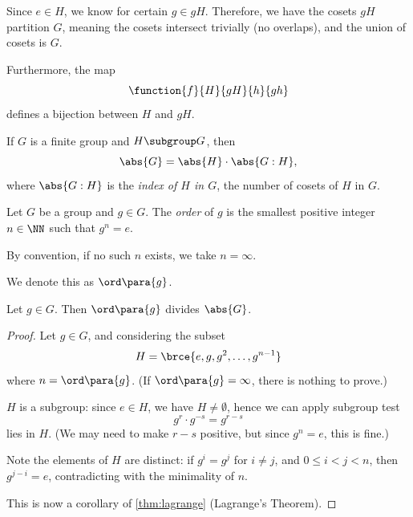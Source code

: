 Since \(e \in H\), we know for certain \(g \in gH\). Therefore, we have the cosets \(gH\) partition \(G\), meaning the cosets intersect trivially (no overlaps), and the union of cosets is \(G\).

Furthermore, the map
\[
    \function{f}{H}{gH}{h}{gh}
\]
defines a bijection between \(H\) and \(gH\).

\begin{theorem}[Lagrange]
    \label{thm:lagrange}%
    If \(G\) is a finite group and \(H \subgroup G\), then
    \[
        \abs{G} = \abs{H} \cdot \abs{G : H},
    \]
    where \(\abs{G : H}\) is the \emph{index of \(H\) in \(G\)}, the number of cosets of \(H\) in \(G\).
\end{theorem}

\begin{definition}
    \label{def:order-of-element}%
    Let \(G\) be a group and \(g \in G\). The \emph{order} of \(g\) is the smallest positive integer \(n \in \NN\) such that \(g^n = e\).

    By convention, if no such \(n\) exists, we take \(n = \infty\).

    We denote this as \(\ord\para{g}\).
\end{definition}

\begin{proposition}
    \label{prop:order-of-element-divides-order-of-group}%
    Let \(g \in G\). Then \(\ord\para{g}\) divides \(\abs{G}\).
\end{proposition}

\begin{proof}
    Let \(g \in G\), and considering the subset
    \[
        H = \brce{e, g, g^2, \ldots, g^{n - 1}}
    \]
    where \(n = \ord\para{g}\). (If \(\ord\para{g} = \infty\), there is nothing to prove.)

    \(H\) is a subgroup: since \(e \in H\), we have \(H \neq \emptyset\), hence we can apply subgroup test
    \[
        g^r \cdot g^{-s} = g^{r - s}
    \]
    lies in \(H\). (We may need to make \(r - s\) positive, but since \(g^n = e\), this is fine.)

    Note the elements of \(H\) are distinct: if \(g^{i} = g^{j}\) for \(i \neq j\), and \(0 \leq i < j < n\), then \(g^{j - i} = e\), contradicting with the minimality of \(n\).

    This is now a corollary of \autoref{thm:lagrange} (Lagrange's Theorem).
\end{proof}